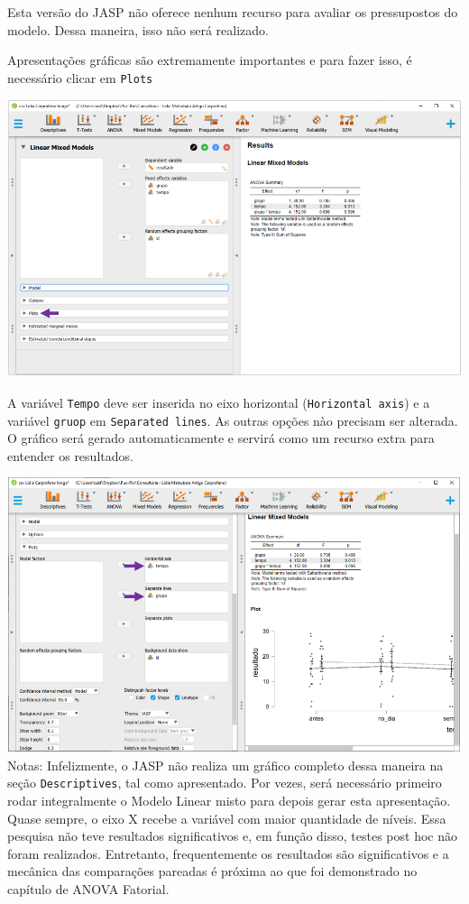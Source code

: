 \documentclass[
]{book}
\begin{document}
Esta versão do JASP não oferece nenhum recurso para avaliar os
pressupostos do modelo. Dessa maneira, isso não será realizado.

Apresentações gráficas são extremamente importantes e para fazer isso, é
necessário clicar em \texttt{Plots}

\includegraphics{./img/cap_lmm_resultados_plots.png}

A variável \texttt{Tempo} deve ser inserida no eixo horizontal
(\texttt{Horizontal\ axis}) e a variável \texttt{gruop} em
\texttt{Separated\ lines}. As outras opções nào precisam ser alterada. O
gráfico será gerado automaticamente e servirá como um recurso extra para
entender os resultados.

\includegraphics{./img/cap_lmm_resultados_plots2.png} Notas:
Infelizmente, o JASP não realiza um gráfico completo dessa maneira na
seção \texttt{Descriptives}, tal como apresentado. Por vezes, será
necessário primeiro rodar integralmente o Modelo Linear misto para
depois gerar esta apresentação. Quase sempre, o eixo X recebe a variável
com maior quantidade de níveis. Essa pesquisa não teve resultados
significativos e, em função disso, testes post hoc não foram realizados.
Entretanto, frequentemente os resultados são significativos e a mecânica
das comparações pareadas é próxima ao que foi demonstrado no capítulo de
ANOVA Fatorial.
\end{document}
